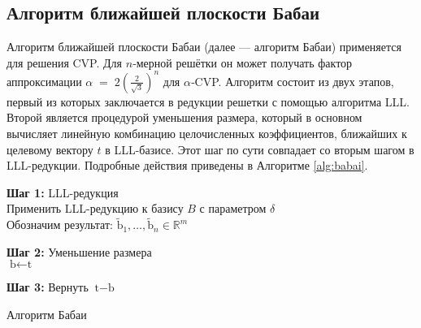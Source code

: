\subsection*{Алгоритм ближайшей плоскости Бабаи}

Алгоритм ближайшей плоскости Бабаи \cite{cite_32} (далее — алгоритм Бабаи)
применяется для решения CVP. Для $n$‑мерной решётки он может получать фактор
аппроксимации $\alpha \;=\; 2\!\left(\frac{2}{\sqrt{3}}\right)^{n}$ для
$\alpha$‑CVP. Алгоритм состоит из двух этапов, первый из которых заключается в
редукции решетки с помощью алгоритма LLL. Второй является процедурой уменьшения
размера, который в основном вычисляет линейную комбинацию целочисленных
коэффициентов, ближайших к целевому вектору $t$ в LLL-базисе. Этот шаг по сути
совпадает со вторым шагом в LLL-редукции. Подробные действия приведены в
Алгоритме \ref{alg:babai}.

\begin{algorithm}[htp!]
    \SetAlgoLined


    \textbf{Шаг 1:} LLL-редукция \\
    Применить LLL-редукцию к базису $B$ с параметром $\delta$ \\
    Обозначим результат: $\tilde{\text{b}}_1, \dots, \tilde{\text{b}}_n \in \mathbb{R}^m$

    \textbf{Шаг 2:} Уменьшение размера \\
    $\text{b} \gets \text{t}$


    \textbf{Шаг 3:} Вернуть $\text{t} - \text{b}$

    \caption{Алгоритм Бабаи}
    \label{alg:babai}
\end{algorithm}

